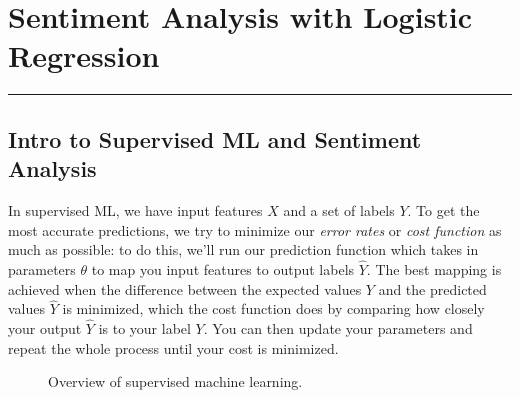 \documentclass[12pt]{article}
\begin{document}
\renewcommand{\d}[1]{\ensuremath{\operatorname{d}\!{#1}}}

\tableofcontents
\newpage
\section{Sentiment Analysis with Logistic Regression}\vspace{.1pt} \hrule height 2pt \smallskip \renewcommand{\arraystretch}{1}%
\subsection{Intro to Supervised ML and Sentiment Analysis}
In supervised ML, we have input features $X$ and a set of labels $Y$. To get the most accurate predictions, we try to minimize our \emph{error rates} or \emph{cost function} as much as possible: to do this, we'll run our prediction function which takes in parameters $\theta$ to map you input features to output labels $\hat Y$. The best mapping is achieved when the difference between the expected values $Y$ and the predicted values $\hat Y$ is minimized, which the cost function does by comparing how closely your output $\hat Y$ is to your label $Y$. You can then update your parameters and repeat the whole process until your cost is minimized.

\begin{figure}[h]
\begin{center}
\end{center}
\label{fig: supervised_ml}
\caption{Overview of supervised machine learning.}
\end{figure}
\end{document}
